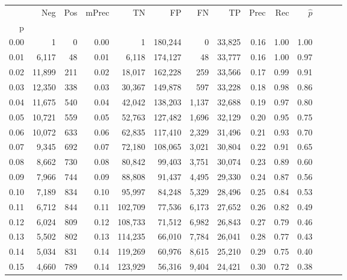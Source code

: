\begin{tabular}{rrrrrrrrrrrrrr}
\toprule
{} &     Neg &  Pos & mPrec &       TN &       FP &      FN &      TP &  Prec &   Rec & $\hat{p}$ \\
p    &         &      &       &          &          &         &         &       &       &           \\
\midrule
0.00 &       1 &    0 &  0.00 &        1 &  180,244 &       0 &  33,825 &  0.16 &  1.00 &      1.00 \\
0.01 &   6,117 &   48 &  0.01 &    6,118 &  174,127 &      48 &  33,777 &  0.16 &  1.00 &      0.97 \\
0.02 &  11,899 &  211 &  0.02 &   18,017 &  162,228 &     259 &  33,566 &  0.17 &  0.99 &      0.91 \\
0.03 &  12,350 &  338 &  0.03 &   30,367 &  149,878 &     597 &  33,228 &  0.18 &  0.98 &      0.86 \\
0.04 &  11,675 &  540 &  0.04 &   42,042 &  138,203 &   1,137 &  32,688 &  0.19 &  0.97 &      0.80 \\
0.05 &  10,721 &  559 &  0.05 &   52,763 &  127,482 &   1,696 &  32,129 &  0.20 &  0.95 &      0.75 \\
0.06 &  10,072 &  633 &  0.06 &   62,835 &  117,410 &   2,329 &  31,496 &  0.21 &  0.93 &      0.70 \\
0.07 &   9,345 &  692 &  0.07 &   72,180 &  108,065 &   3,021 &  30,804 &  0.22 &  0.91 &      0.65 \\
0.08 &   8,662 &  730 &  0.08 &   80,842 &   99,403 &   3,751 &  30,074 &  0.23 &  0.89 &      0.60 \\
0.09 &   7,966 &  744 &  0.09 &   88,808 &   91,437 &   4,495 &  29,330 &  0.24 &  0.87 &      0.56 \\
0.10 &   7,189 &  834 &  0.10 &   95,997 &   84,248 &   5,329 &  28,496 &  0.25 &  0.84 &      0.53 \\
0.11 &   6,712 &  844 &  0.11 &  102,709 &   77,536 &   6,173 &  27,652 &  0.26 &  0.82 &      0.49 \\
0.12 &   6,024 &  809 &  0.12 &  108,733 &   71,512 &   6,982 &  26,843 &  0.27 &  0.79 &      0.46 \\
0.13 &   5,502 &  802 &  0.13 &  114,235 &   66,010 &   7,784 &  26,041 &  0.28 &  0.77 &      0.43 \\
0.14 &   5,034 &  831 &  0.14 &  119,269 &   60,976 &   8,615 &  25,210 &  0.29 &  0.75 &      0.40 \\
0.15 &   4,660 &  789 &  0.14 &  123,929 &   56,316 &   9,404 &  24,421 &  0.30 &  0.72 &      0.38 \\

\end{tabular}
